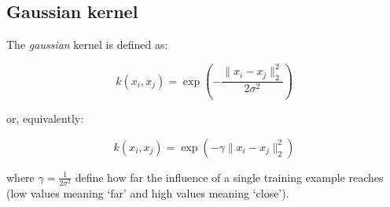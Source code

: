 \pagebreak

\subsection{Gaussian kernel}

The \emph{gaussian} kernel is defined as:

\begin{equation} \label{eq:gaussian_kernel1}
	k(x_i,x_j)=\exp(-\frac{\|x_i-x_j\|_2^2}{2\sigma^2})
\end{equation}

or, equivalently:

\begin{equation} \label{eq:gaussian_kernel2}
	k(x_i,x_j)=\exp(-\gamma \|x_i-x_j\|_2^2)
\end{equation}

where $\displaystyle \gamma=\frac{1}{2\sigma^2}$ define how far the influence of a single training example reaches (low values meaning ‘far’ and high values meaning ‘close’).

